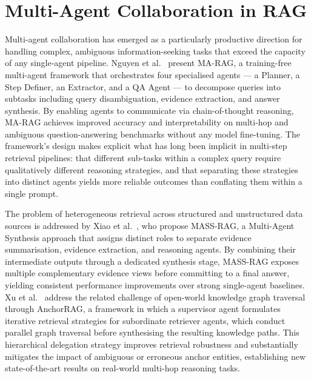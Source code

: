 \section{Multi-Agent Collaboration in RAG}
 
Multi-agent collaboration has emerged as a particularly productive direction for
handling complex, ambiguous information-seeking tasks that exceed the capacity of any
single-agent pipeline.
Nguyen et al.~\cite{nguyen2025marag} present MA-RAG, a training-free multi-agent
framework that orchestrates four specialised agents — a Planner, a Step Definer, an
Extractor, and a QA Agent — to decompose queries into subtasks including query
disambiguation, evidence extraction, and answer synthesis.
By enabling agents to communicate via chain-of-thought reasoning, MA-RAG achieves
improved accuracy and interpretability on multi-hop and ambiguous question-answering
benchmarks without any model fine-tuning.
The framework's design makes explicit what has long been implicit in multi-step
retrieval pipelines: that different sub-tasks within a complex query require
qualitatively different reasoning strategies, and that separating these strategies
into distinct agents yields more reliable outcomes than conflating them within a
single prompt.
 
The problem of heterogeneous retrieval across structured and unstructured data sources
is addressed by Xiao et al.~\cite{xiao2026massrag}, who propose MASS-RAG, a
Multi-Agent Synthesis approach that assigns distinct roles to separate evidence
summarisation, evidence extraction, and reasoning agents.
By combining their intermediate outputs through a dedicated synthesis stage,
MASS-RAG exposes multiple complementary evidence views before committing to a final
answer, yielding consistent performance improvements over strong single-agent baselines.
Xu et al.~\cite{xu2026anchorrag} address the related challenge of open-world
knowledge graph traversal through AnchorRAG, a framework in which a supervisor agent
formulates iterative retrieval strategies for subordinate retriever agents, which
conduct parallel graph traversal before synthesising the resulting knowledge paths.
This hierarchical delegation strategy improves retrieval robustness and substantially
mitigates the impact of ambiguous or erroneous anchor entities, establishing new
state-of-the-art results on real-world multi-hop reasoning tasks.

